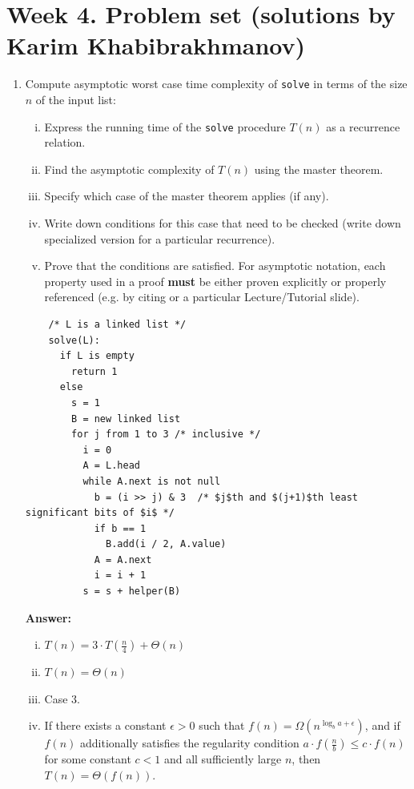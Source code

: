 \documentclass[dvipsnames]{article}
\begin{document}
\section*{Week 4. Problem set (solutions by Karim Khabibrakhmanov)}

\thispagestyle{fancy}

\begin{enumerate}

  \item Compute asymptotic worst case time complexity of \texttt{solve} in terms of the size $n$ of the input list:
  \begin{enumerate}[(i)]
    \item Express the running time of the \texttt{solve} procedure $T(n)$ as a recurrence relation.
    \item Find the asymptotic complexity of $T(n)$ using the master theorem.
    \item Specify which case of the master theorem applies (if any).
    \item Write down conditions for this case that need to be checked (write down specialized version for a particular recurrence).
    \item Prove that the conditions are satisfied.
    For asymptotic notation, each property used in a proof \textbf{must} be either
    proven explicitly or properly referenced (e.g. by citing \cite{Cormen2022} or a particular Lecture/Tutorial slide).
  \end{enumerate}

  \begin{verbatim}
    /* L is a linked list */
    solve(L):
      if L is empty
        return 1
      else
        s = 1
        B = new linked list
        for j from 1 to 3 /* inclusive */
          i = 0
          A = L.head
          while A.next is not null
            b = (i >> j) & 3  /* $j$th and $(j+1)$th least significant bits of $i$ */
            if b == 1
              B.add(i / 2, A.value)
            A = A.next
            i = i + 1
          s = s + helper(B)
    \end{verbatim}

    \color{blue}
    \textbf{Answer:}
    \begin{enumerate}[(i)]
    \item $T(n) = 3 \cdot T(\frac{n}{4}) + \Theta(n )$
    \item $T(n) = \Theta(n)$
    \item Case 3.
    \item If there exists a constant $ \epsilon > 0 $ such that $ f(n) = \Omega(n^{\log_b a + \epsilon}) $, and if $ f(n) $ additionally satisfies the regularity condition $ a \cdot f\left(\frac{n}{b}\right) \leq c \cdot f(n) $ for some constant $ c < 1 $ and all sufficiently large $ n $, then $ T(n) = \Theta(f(n))$.
    

\end{enumerate}
\end{enumerate}
\end{document}
